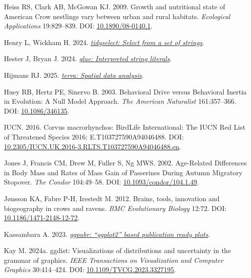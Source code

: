 \documentclass[10pt,a4paper]{article}
\newlength{\cslhangindent}
\newenvironment{CSLReferences}[2] %
 {\begin{list}{}{%
  \setlength{\itemindent}{0pt}
  \setlength{\leftmargin}{0pt}
  \setlength{\parsep}{0pt}
  \ifodd #1
   \setlength{\leftmargin}{\cslhangindent}
   \setlength{\itemindent}{-1\cslhangindent}
  \fi
  \setlength{\itemsep}{#2\baselineskip}}}
 {\end{list}}
\begin{document}
\begin{CSLReferences}{1}{0}
Heiss RS, Clark AB, McGowan KJ. 2009. Growth and nutritional state of {American} {Crow} nestlings vary between urban and rural habitats. \emph{Ecological Applications} 19:829--839. DOI: \href{https://doi.org/10.1890/08-0140.1}{10.1890/08-0140.1}.

Henry L, Wickham H. 2024. \emph{\href{https://CRAN.R-project.org/package=tidyselect}{{tidyselect}: Select from a set of strings}}.

Hester J, Bryan J. 2024. \emph{\href{https://CRAN.R-project.org/package=glue}{{glue}: Interpreted string literals}}.

Hijmans RJ. 2025. \emph{\href{https://CRAN.R-project.org/package=terra}{{terra}: Spatial data analysis}}.

Huey RB, Hertz PE, Sinervo B. 2003. Behavioral {Drive} versus {Behavioral} {Inertia} in {Evolution}: {A} {Null} {Model} {Approach}. \emph{The American Naturalist} 161:357--366. DOI: \href{https://doi.org/10.1086/346135}{10.1086/346135}.

IUCN. 2016. Corvus macrorhynchos: {BirdLife} {International}: {The} {IUCN} {Red} {List} of {Threatened} {Species} 2016: E.{T103727590A94046488}. DOI: \href{https://doi.org/10.2305/IUCN.UK.2016-3.RLTS.T103727590A94046488.en}{10.2305/IUCN.UK.2016-3.RLTS.T103727590A94046488.en}.

Jones J, Francis CM, Drew M, Fuller S, Ng MWS. 2002. Age-{Related} {Differences} in {Body} {Mass} and {Rates} of {Mass} {Gain} of {Passerines} {During} {Autumn} {Migratory} {Stopover}. \emph{The Condor} 104:49--58. DOI: \href{https://doi.org/10.1093/condor/104.1.49}{10.1093/condor/104.1.49}.

Jønsson KA, Fabre P-H, Irestedt M. 2012. Brains, tools, innovation and biogeography in crows and ravens. \emph{BMC Evolutionary Biology} 12:72. DOI: \href{https://doi.org/10.1186/1471-2148-12-72}{10.1186/1471-2148-12-72}.

Kassambara A. 2023. \emph{\href{https://CRAN.R-project.org/package=ggpubr}{{ggpubr}: {``{ggplot2}''} based publication ready plots}}.

Kay M. 2024a. {ggdist}: Visualizations of distributions and uncertainty in the grammar of graphics. \emph{IEEE Transactions on Visualization and Computer Graphics} 30:414--424. DOI: \href{https://doi.org/10.1109/TVCG.2023.3327195}{10.1109/TVCG.2023.3327195}.


\end{CSLReferences}
\end{document}

